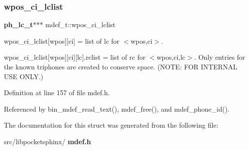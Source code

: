 \mbox{\label{structmdef__t_a5dd5c3d3058a314f4c971a14d1df5f38}} 
\subsubsection{wpos\+\_\+ci\+\_\+lclist}
{\footnotesize\ttfamily \textbf{ ph\+\_\+lc\+\_\+t}$\ast$$\ast$$\ast$ mdef\+\_\+t\+::wpos\+\_\+ci\+\_\+lclist}



wpos\+\_\+ci\+\_\+lclist[wpos][ci] = list of lc for $<$wpos,ci$>$. 

wpos\+\_\+ci\+\_\+lclist[wpos][ci][lc].rclist = list of rc for $<$wpos,ci,lc$>$. Only entries for the known triphones are created to conserve space. (N\+O\+TE\+: F\+OR I\+N\+T\+E\+R\+N\+AL U\+SE O\+N\+LY.) 

Definition at line 157 of file mdef.\+h.



Referenced by bin\+\_\+mdef\+\_\+read\+\_\+text(), mdef\+\_\+free(), and mdef\+\_\+phone\+\_\+id().



The documentation for this struct was generated from the following file\+:\begin{DoxyCompactItemize}
\item 
src/libpocketsphinx/\textbf{ mdef.\+h}\end{DoxyCompactItemize}
